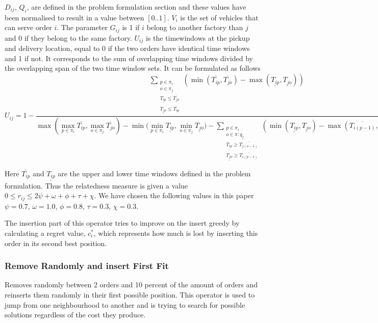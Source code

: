 \documentclass[../main.tex]{subfiles}
\begin{document}
$D_{ij}$, $Q_i$, are defined in the problem formulation section and these values have been normalised to result in a value between $[0..1]$. 
$V_i$ is the set of vehicles that can serve order $i$. 
The parameter $G_{ij}$ is 1 if $i$ belong to another factory than $j$ and 0 if they belong to the same factory. 
$U_{ij}$ is the timewindows at the pickup and delivery location, equal to 0 if the two orders have identical time windows and 1 if not. It corresponds to the sum of overlapping time windows divided by the overlapping span of the two time window sets.
It can be formulated as follows
\begin{equation}
    \label{overlaptime}
    U_{ij} = 1 - 
\dfrac{ 
    \sum\limits_{\substack{p\in \pi_i\\ o\in \pi_j\\ \underline{T_{ip}}\leq \overline{T_{jo}}\\ \underline{T_{jo}}\leq\overline{T_{ip}}}} 
    (\min(\overline{T_{ip}}, \overline{T_{jo}}) - \max(\underline{T_{ip}},\underline{T_{jo}}) )
    }
    {\max{(\max\limits_{p\in \pi_i} \overline{T_{ip}}, \max\limits_{o\in \pi_j} \overline{T_{jo}})} - 
    \min{(\min\limits_{p\in \pi_i} \underline{T_{ip}}, \min\limits_{o\in \pi_j} \underline{T_{jo}}}) -     
    \sum\limits_{\substack{p\in \pi_i\\ o\in \pi:q_j\\ \underline{T_{ip}}\geq \overline{T_{j(o-1)}}\\ \underline{T_{jo}}\geq\overline{T_{i(p-1)}}}} 
    (\min(\underline{T_{ip}}, \underline{T_{jo}}) - \max(\overline{T_{i(p-1)}},\overline{T_{j(o-1)}}) ) 
    }
\end{equation}

Here $\overline{T_{ip}}$ and $\underline{T_{ip}}$ are the upper and lower time windows defined in the problem formulation.
Thus the relatedness measure is given a value $0\leq r_{ij} \leq 2\psi + \omega + \phi + \tau  + \chi$. 
We have chosen the following values in this paper $\psi=0.7$, $\omega=1.0$, $\phi=0.8$, $\tau=0.3$, $\chi = 0.3$. \newline\par
The insertion part of this operator tries to improve on the insert greedy by calculating a regret value, $c^*_i$, which represents how much is lost by inserting this order in its second best position.

\subsubsection{Remove Randomly and insert First Fit}
Removes randomly between 2 orders and 10 percent of the amount of orders and reinserts them randomly in their first possible position. 
This operator is used to jump from one neighbourhood to another and is trying to search for possible solutions regardless of the cost they produce.
\end{document}
